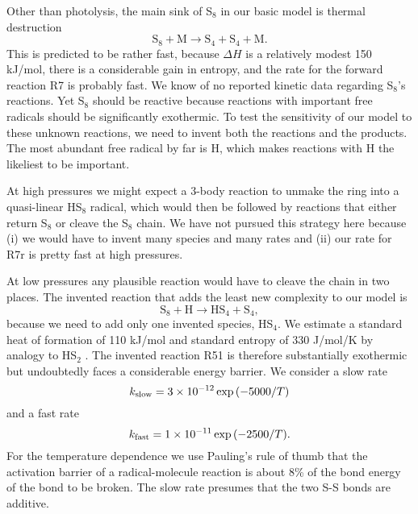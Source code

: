 \documentclass[preprint]{aastex6}
\newcounter{reaction}
\begin{document}
Other than photolysis, the main sink of S$_8$ in our basic model is thermal destruction
\begin{equation}\tag{R7r}
\mathrm{S}_8 + \mathrm{M} \rightarrow \mathrm{S}_4 + \mathrm{S}_4 + \mathrm{M} .
\end{equation}
This is predicted to be rather fast, because $\Delta H$ is a relatively modest 150 kJ/mol,
there is a considerable gain in entropy, and the rate for the forward reaction R7 is probably fast.
We know of no reported kinetic data regarding S$_8$'s reactions.
Yet S$_8$ should be reactive because reactions with important free radicals should be significantly exothermic.
To test the sensitivity of our model to these unknown reactions, we need to invent both the reactions and the products.
The most abundant free radical by far is H, which makes reactions with H the likeliest to be important.

At high pressures we might expect a 3-body reaction to unmake the ring into a quasi-linear HS$_8$ radical,
which would then be followed by reactions that either return S$_8$ or cleave the S$_8$ chain.
We have not pursued this strategy here because (i) we would have to invent many species and many rates
and (ii) our rate for R7r is pretty fast at high pressures.

At low pressures any plausible reaction would have to cleave the chain in two places.
The invented reaction that adds the least new complexity to our model is
\begin{equation}\tag{R51}
\mathrm{S}_8 + \mathrm{H} \rightarrow \mathrm{HS}_4 + \mathrm{S}_4,
\end{equation}
because we need to add only one invented species, HS$_4$.
We estimate a standard heat of formation of 110 kJ/mol and standard entropy of 330 J/mol/K
 by analogy to HS$_2$ \citep{Benson1978}.
The invented reaction R51 is therefore substantially exothermic but undoubtedly faces a considerable energy barrier.
We consider a slow rate   
\begin{equation}\label{slow}
k_{\rm slow} = 3\times 10^{-12} \exp{\left(-5000/T\right)}
\end{equation}
and a fast rate   
\begin{equation}\label{fast}
k_{\rm fast} = 1\times 10^{-11} \exp{\left(-2500/T\right)} .
\end{equation}
For the temperature dependence we use Pauling's rule of thumb \citep[][p.\ 568]{Pauling1970} that the
activation barrier of a radical-molecule reaction is about 8\% of the bond energy of the bond to be broken.
The slow rate presumes that the two S-S bonds are additive.
\end{document}
